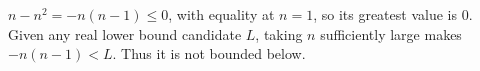 $ n-n^2=-n(n-1)\le0 $, with equality at $ n=1 $, so its greatest value is $ 0 $. Given any real lower bound candidate $ L $, taking $ n $ sufficiently large makes $-n(n-1)<L $. Thus it is not bounded below.
